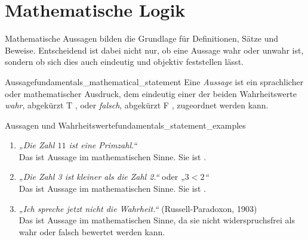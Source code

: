 \section{Mathematische Logik}
\label{sec:fundamentals_mathematical_logic}

Mathematische Aussagen bilden die Grundlage für Definitionen, Sätze und
Beweise. Entscheidend ist dabei nicht nur, ob eine Aussage wahr oder unwahr ist,
sondern ob sich dies auch eindeutig und objektiv feststellen lässt.

\begin{DefinitionBox}{Aussage}{fundamentals_mathematical_statement}
  Eine \emph{Aussage}  ist ein sprachlicher oder
  mathematischer Ausdruck, dem eindeutig einer der beiden Wahrheitswerte
  \emph{wahr}, abgekürzt T , oder \emph{falsch}, abgekürzt F
  , zugeordnet werden kann.
\end{DefinitionBox}

\begin{ExampleBox}{Aussagen und Wahrheitswerte}{fundamentals_statement_examples}
  \begin{enumerate}[label=\alph*),itemsep=0.4em]
    \item \emph{„Die Zahl $11$ ist eine Primzahl.“} \\
    Das ist  Aussage im mathematischen Sinne. Sie ist .
    \item \emph{„Die Zahl 3 ist kleiner als die Zahl 2.“} oder
    \emph{„$3<2$“} \\
    Das ist  Aussage im mathematischen Sinne. Sie ist .
    \item \emph{„Ich spreche jetzt nicht die Wahrheit.“}
    (Russell-Paradoxon, 1903) \\
    Das ist  Aussage im mathematischen Sinne, da sie nicht widerspruchsfrei als wahr oder falsch bewertet werden kann.
  \end{enumerate}
\end{ExampleBox}






